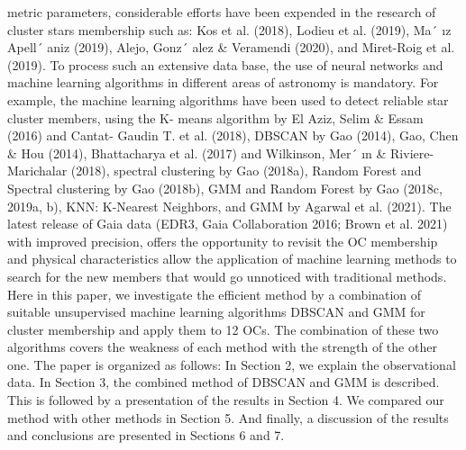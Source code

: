 \documentclass[../Main.tex]{subfiles}
\begin{document}
metric parameters, considerable efforts have been expended in the
research of cluster stars membership such as: Kos et al. (2018),
Lodieu et al. (2019), Ma´
ız Apell´ aniz (2019), Alejo, Gonz´ alez \&
Veramendi (2020), and Miret-Roig et al. (2019).
To process such an extensive data base, the use of neural networks
and machine learning algorithms in different areas of astronomy
is mandatory. For example, the machine learning algorithms have
been used to detect reliable star cluster members, using the K-
means algorithm by El Aziz, Selim \& Essam (2016) and Cantat-
Gaudin T. et al. (2018), DBSCAN by Gao (2014), Gao, Chen \& Hou
(2014), Bhattacharya et al. (2017) and Wilkinson, Mer´
ın \& Riviere-
Marichalar (2018), spectral clustering by Gao (2018a), Random
Forest and Spectral clustering by Gao (2018b), GMM and Random
Forest by Gao (2018c, 2019a, b), KNN: K-Nearest Neighbors, and
GMM by Agarwal et al. (2021).
The latest release of Gaia data (EDR3, Gaia Collaboration 2016;
Brown et al. 2021) with improved precision, offers the opportunity
to revisit the OC membership and physical characteristics allow
the application of machine learning methods to search for the new
members that would go unnoticed with traditional methods. Here in
this paper, we investigate the efficient method by a combination of
suitable unsupervised machine learning algorithms DBSCAN and GMM for cluster membership and apply them to 12 OCs. The
combination of these two algorithms covers the weakness of each
method with the strength of the other one. The paper is organized as
follows: In Section 2, we explain the observational data. In Section 3,
the combined method of DBSCAN and GMM is described. This is
followed by a presentation of the results in Section 4. We compared
our method with other methods in Section 5. And finally, a discussion
of the results and conclusions are presented in Sections 6 and 7.
\end{document}
